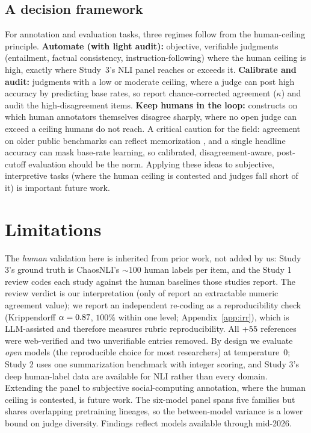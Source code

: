 \subsection{A decision framework}
For annotation and evaluation tasks, three regimes follow from the human-ceiling principle. \textbf{Automate (with
light audit):} objective, verifiable judgments (entailment, factual consistency, instruction-following) where the
human ceiling is high, exactly where Study~3's NLI panel reaches or exceeds it. \textbf{Calibrate and audit:}
judgments with a low or moderate ceiling, where a judge can post high accuracy by predicting base rates, so report
chance-corrected agreement ($\kappa$) and audit the high-disagreement items. \textbf{Keep humans in the loop:}
constructs on which human annotators themselves disagree sharply, where no open judge can exceed a ceiling humans do
not reach. A critical caution for the field: agreement on older public benchmarks can reflect memorization
\citep{bender2021parrots}, and a single headline accuracy can mask base-rate learning, so calibrated,
disagreement-aware, post-cutoff evaluation should be the norm. Applying these ideas to subjective, interpretive tasks (where the human ceiling is contested and judges fall short of it) is important future work.
\section{Limitations}
The \emph{human} validation here is inherited from prior work, not added by us: Study 3's ground truth is ChaosNLI's
${\sim}100$ human labels per item, and the Study 1 review codes each study against the human baselines those studies
report. The review verdict is our interpretation (only \Nnumeric{} of \Nstudies{} report an extractable numeric
agreement value); we report an independent re-coding as a reproducibility check (Krippendorff $\alpha=0.87$,
$100\%$ within one level; Appendix~\ref{app:irr}), which is LLM-assisted and therefore measures rubric
reproducibility. All \Nstudies{}${+}55{}$ references were web-verified and two unverifiable entries removed.
By design we evaluate \emph{open} models (the reproducible choice for most researchers) at temperature~0; Study 2
uses one summarization benchmark with integer scoring, and Study 3's deep human-label data are available for NLI
rather than every domain. Extending the panel to subjective social-computing annotation, where the human ceiling is contested, is future work. The six-model panel spans five families but shares overlapping pretraining lineages, so the between-model variance
is a lower bound on judge diversity. Findings reflect models available through mid-2026.
